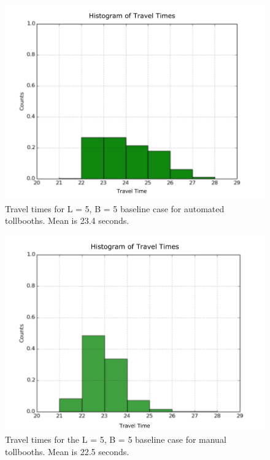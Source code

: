 \documentclass[a4paper, 11pt]{article}
\begin{document}


\begin{figure}[H]
\begin{center}
\includegraphics[scale=0.25]{Images/55_ez.png}
\caption{Travel times for L = 5, B = 5 baseline case for automated tollbooths. Mean is 23.4 seconds. }
\label{fig:ez55}
\end{center}
\end{figure}

\begin{figure}[H]
\begin{center}
\includegraphics[scale=0.25]{Images/55_man.png}
\caption{Travel times for the L = 5, B = 5 baseline case for manual tollbooths. Mean is 22.5 seconds.}
\label{fig:manual55}
\end{center}
\end{figure}
\end{document}
